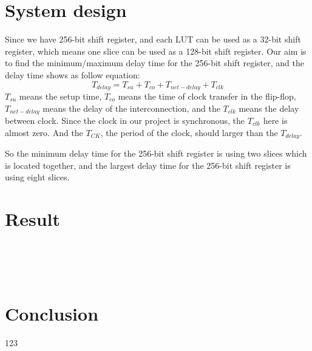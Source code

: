 \documentclass[12pt]{article}
\begin{document}
\section{System design}  \label{a3}
Since we have 256-bit shift register, and each LUT can be used as a 32-bit shift register, which means one slice can be used as a 128-bit shift register. Our aim is to find the minimum/maximum delay time for the 256-bit shift register, and the delay time shows as follow equation:
$$T_{delay}=T_{su}+T_{co}+T_{net-delay}+T_{clk}$$
$T_{su}$ means the setup time, $T_{co}$ means the time of clock transfer in the flip-flop, $T_{net-delay}$ means the delay of the interconnection, and the $T_{clk}$ means the delay between clock. Since the clock in our project is synchronous, the $T_{clk}$ here is almost zero. And the $T_{CK}$, the period of the clock, should larger than the $T_{delay}$.

So the minimum delay time for the 256-bit shift register is using two slices which is located together, and the largest delay time for the 256-bit shift register is using eight slices.
 

\section{Result}  \label{a4}

\lipsum[1]\\
\lipsum[1]\\
\lipsum[1]\\

\section{Conclusion}  \label{a5}
123
\newpage


\end{document}
